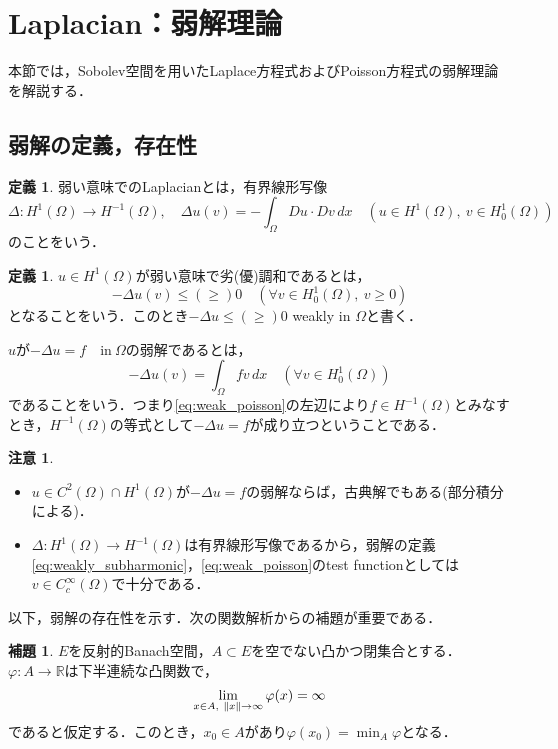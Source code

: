 \documentclass[a4paper]{ltjsarticle}
\newcommand{\Rset}{\mathbb{R}}
\newcommand{\Om}{\Omega}
\newcommand{\inn}{\quad\text{in}\ }
\newcommand{\1}{\mathbbm{1}}
\numberwithin{equation}{section}
\theoremstyle{definition}
\newtheorem{dfn}[thm]{定義}
\newtheorem{lem}[thm]{補題}
\newtheorem{rmk}[thm]{注意}
\begin{document}
\section{Laplacian：弱解理論}
本節では，Sobolev空間を用いたLaplace方程式およびPoisson方程式の弱解理論を解説する．
\subsection{弱解の定義，存在性}
\begin{dfn}
    弱い意味でのLaplacianとは，有界線形写像
    \begin{equation}
        \Delta\colon H^1(\Om)\to H^{-1}(\Om),\quad \Delta u(v)=-\int_{\Om}Du\cdot Dv\,dx\quad (u\in H^1(\Om),\ v\in H^{1}_{0}(\Om))
    \end{equation}
    のことをいう．
\end{dfn}
\begin{dfn}
    $u\in H^1(\Om)$が弱い意味で劣(優)調和であるとは，
    \begin{equation}
        -\Delta u(v)\leq(\geq) 0\quad (\forall v\in H^1_0(\Om),\ v\geq0 )\label{eq:weakly_subharmonic}
    \end{equation}
    となることをいう．このとき$-\Delta u\leq(\geq)0$ weakly in $\Om$と書く．

    $u$が$-\Delta u=f\inn \Om$の弱解であるとは，
    \begin{equation}
        -\Delta u(v)=\int_{\Om}fv\,dx\quad (\forall v\in H^1_0(\Om)) \label{eq:weak_poisson}
    \end{equation}
    であることをいう．つまり\eqref{eq:weak_poisson}の左辺により$f\in H^{-1}(\Om)$とみなすとき，$H^{-1}(\Om)$の等式として$-\Delta u=f$が成り立つということである．
\end{dfn}
\begin{rmk}
    \begin{itemize}
        \item $u\in C^2(\Om)\cap H^1(\Om)$が$-\Delta u=f$の弱解ならば，古典解でもある(部分積分による)．
        \item $\Delta\colon H^1(\Om)\to H^{-1}(\Om)$は有界線形写像であるから，弱解の定義\eqref{eq:weakly_subharmonic}，\eqref{eq:weak_poisson}のtest functionとしては$v\in C^\infty_c(\Om)$で十分である．
    \end{itemize}
\end{rmk}
以下，弱解の存在性を示す．次の関数解析からの補題が重要である．
\begin{lem}\label{lem:direct_method}
    $E$を反射的Banach空間，$A\subset E$を空でない凸かつ閉集合とする．$\varphi\colon A\to \Rset$は下半連続な凸関数で，
    \begin{equation}
        \lim_{x\in A,\ \norm{x}\to\infty}\varphi(x)=\infty 
    \end{equation}
    であると仮定する．このとき，$x_0\in A$があり$\varphi(x_0)=\min_{A}\varphi$となる．
\end{lem}
\end{document}
